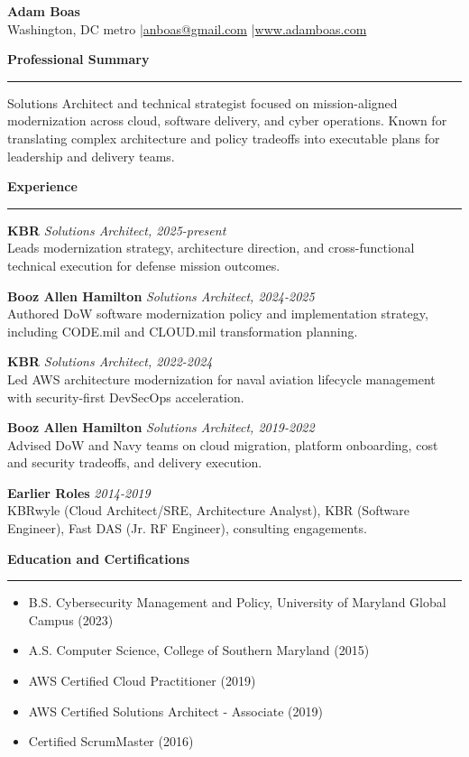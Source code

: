 \documentclass[10pt]{article}
\newcommand{\ResumeSection}[1]{\vspace{0.4em}\textbf{\large #1}\par\vspace{0.2em}\textcolor{accentgold}{\rule{\textwidth}{0.7pt}}\vspace{0.2em}}
\begin{document}

\begin{center}
{\LARGE\bfseries Adam Boas}\\
\small Washington, DC metro \quad|\quad \href{mailto:anboas@gmail.com}{anboas@gmail.com} \quad|\quad \href{https://www.adamboas.com}{www.adamboas.com}
\end{center}

\ResumeSection{Professional Summary}
Solutions Architect and technical strategist focused on mission-aligned modernization across cloud, software delivery, and cyber operations. Known for translating complex architecture and policy tradeoffs into executable plans for leadership and delivery teams.

\ResumeSection{Experience}
\textbf{KBR} \hfill \textit{Solutions Architect, 2025-present}\\
Leads modernization strategy, architecture direction, and cross-functional technical execution for defense mission outcomes.

\textbf{Booz Allen Hamilton} \hfill \textit{Solutions Architect, 2024-2025}\\
Authored DoW software modernization policy and implementation strategy, including CODE.mil and CLOUD.mil transformation planning.

\textbf{KBR} \hfill \textit{Solutions Architect, 2022-2024}\\
Led AWS architecture modernization for naval aviation lifecycle management with security-first DevSecOps acceleration.

\textbf{Booz Allen Hamilton} \hfill \textit{Solutions Architect, 2019-2022}\\
Advised DoW and Navy teams on cloud migration, platform onboarding, cost and security tradeoffs, and delivery execution.

\textbf{Earlier Roles} \hfill \textit{2014-2019}\\
KBRwyle (Cloud Architect/SRE, Architecture Analyst), KBR (Software Engineer), Fast DAS (Jr. RF Engineer), consulting engagements.

\ResumeSection{Education and Certifications}
\begin{itemize}
  \item B.S. Cybersecurity Management and Policy, University of Maryland Global Campus (2023)
  \item A.S. Computer Science, College of Southern Maryland (2015)
  \item AWS Certified Cloud Practitioner (2019)
  \item AWS Certified Solutions Architect - Associate (2019)
  \item Certified ScrumMaster (2016)
\end{itemize}
\end{document}
